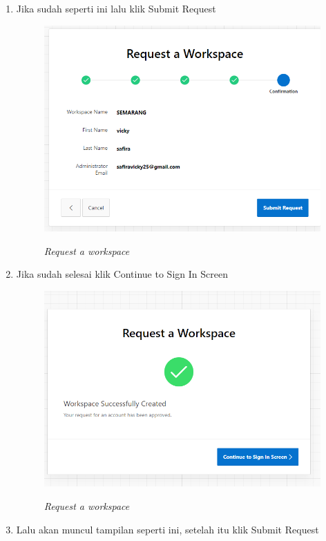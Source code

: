 \begin{enumerate}
\item Jika sudah seperti ini lalu klik Submit Request
\begin{figure}[!htbp]
    \centering
    \includegraphics[scale=0.5]{figure/22.PNG}
    \label{gambar 5}
    \caption{\textit{Request a workspace}}
\end{figure} \vspace{6cm}
\item Jika sudah selesai  klik Continue to Sign In Screen
\begin{figure}[!htbp]
    \centering
    \includegraphics[scale=0.5]{figure/8.PNG}
    \label{gambar 6}
    \caption{\textit{Request a workspace}}
\end{figure}
\item Lalu akan muncul tampilan seperti ini, setelah itu klik Submit Request

\end{enumerate}
